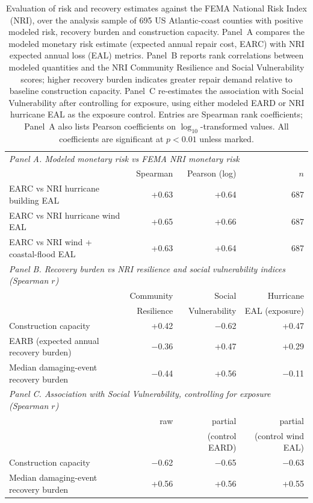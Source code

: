 \begin{table}[htb!]
\centering
\caption{Evaluation of risk and recovery estimates against the FEMA National Risk Index (NRI), over the analysis sample of 695 US Atlantic-coast counties with positive modeled risk, recovery burden and construction capacity. Panel~A compares the modeled monetary risk estimate (expected annual repair cost, EARC) with NRI expected annual loss (EAL) metrics. Panel~B reports rank correlations between modeled quantities and the NRI Community Resilience and Social Vulnerability scores; higher recovery burden indicates greater repair demand relative to baseline construction capacity. Panel~C re-estimates the association with Social Vulnerability after controlling for exposure, using either modeled EARD or NRI hurricane EAL as the exposure control. Entries are Spearman rank coefficients; Panel~A also lists Pearson coefficients on $\log_{10}$-transformed values. All coefficients are significant at $p<0.01$ unless marked.}
\label{tab:nri_evaluation}
\begin{tabular}{lrrr}
\hline
\multicolumn{4}{l}{\textit{Panel A. Modeled monetary risk vs FEMA NRI monetary risk}}\\
 & Spearman & Pearson (log) & $n$ \\
\hline
EARC vs NRI hurricane building EAL & +0.63 & +0.64 & 687 \\
EARC vs NRI hurricane wind EAL & +0.65 & +0.66 & 687 \\
EARC vs NRI wind + coastal-flood EAL & +0.63 & +0.64 & 687 \\
\hline
\multicolumn{4}{l}{\textit{Panel B. Recovery burden vs NRI resilience and social vulnerability indices (Spearman $r$)}}\\
 & Community & Social & Hurricane \\
 & Resilience & Vulnerability & EAL (exposure) \\
\hline
Construction capacity & +0.42 & $-$0.62 & +0.47 \\
EARB (expected annual recovery burden) & $-$0.36 & +0.47 & +0.29 \\
Median damaging-event recovery burden & $-$0.44 & +0.56 & $-$0.11 \\
\hline
\multicolumn{4}{l}{\textit{Panel C. Association with Social Vulnerability, controlling for exposure (Spearman $r$)}}\\
 & raw & partial & partial \\
 & & (control EARD) & (control wind EAL) \\
\hline
Construction capacity & $-$0.62 & $-$0.65 & $-$0.63 \\
Median damaging-event recovery burden & +0.56 & +0.56 & +0.55 \\
\hline
\end{tabular}
\end{table}
